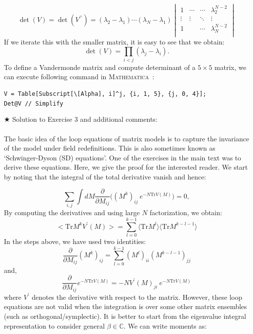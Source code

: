 \documentclass[letter,11pt]{article}
\newcommand{\MA}{\textsc{Mathematica}}
\begin{document}
\begin{equation}
	\det(V) = \det(V^{\prime\prime}) = 
	(\lambda_2 - \lambda_1) \cdots (\lambda_N - \lambda_1)
	\begin{vmatrix}
		1 & \cdots & \cdots & \lambda_2^{N-2} \\ 
		\vdots  & \vdots  & \ddots & \vdots  \\
		1 &  & \cdots &  \lambda_N^{N-2} \\
	\end{vmatrix}
\end{equation}
If we iterate this with the smaller matrix, it is easy to see that we obtain:
\begin{equation}
	\det(V) = \prod_{i<j} (\lambda_j - \lambda_i).
\end{equation}
To define a Vandermonde matrix and compute determinant of a $ 5 \times 5$ matrix, we can execute following command in \MA~:
\begin{mdframed}[backgroundcolor=magenta!2]
	\begin{footnotesize} 
		\verb"V = Table[Subscript[\[Alpha], i]^j, {i, 1, 5}, {j, 0, 4}];"\\ 
		\verb"Det@V // Simplify"
	\end{footnotesize} 
\end{mdframed}

\noindent $\bigstar$ Solution to Exercise 3 and additional comments: 
\\ \\ 
The basic idea of the loop equations of matrix models is to capture the invariance of the model under field redefinitions. This is also sometimes known as `Schwinger-Dyson (SD) equations'. One of the exercises in the main text was to derive these equations. Here, we give the proof for the interested reader. We start by noting that the integral of the total derivative vanish and hence:

\begin{equation}
	\sum_{i,j} \int dM \frac{\partial}{\partial M_{ij}} \Bigg( (M^k)_{ij}~e^{-N\mathrm{Tr} V(M)}\Bigg) = 0, 
\end{equation}
By computing the derivatives and using large $N$ factorization, we obtain:
\begin{equation}
	\Big< \mathrm{Tr} M^{k} V^{\prime}(M) \Big> = \sum_{l=0}^{k-1} \langle \mathrm{Tr} M^{l} \rangle  \langle \mathrm{Tr} M^{k-l-1} \rangle
\end{equation}
In the steps above, we have used two identities:
\begin{equation}
	\frac{\partial}{\partial M_{ij}} (M^{k})_{ij} = \sum_{l=0}^{k-1} (M^{l})_{ii} (M^{k-l-1})_{jj}
\end{equation}
and, 
\begin{equation}
	\frac{\partial}{\partial M_{ij}} e^{-N\mathrm{Tr} V(M)} = -N V^{\prime}(M)_{ji}~e^{-N\mathrm{Tr} V(M)}
\end{equation}
where $V^{\prime}$ denotes the derivative with respect to the matrix. 
However, these loop equations are not valid when the integration is over some other matrix ensembles (such as orthogonal/symplectic). It is better to start from the eigenvalue integral representation to consider general $\beta \in \mathbb{C}$. We can write moments as:
\end{document}
